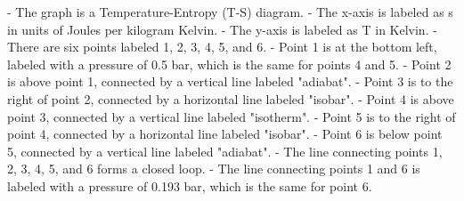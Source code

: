 - The graph is a Temperature-Entropy (T-S) diagram.
- The x-axis is labeled as s in units of Joules per kilogram Kelvin.
- The y-axis is labeled as T in Kelvin.
- There are six points labeled 1, 2, 3, 4, 5, and 6.
- Point 1 is at the bottom left, labeled with a pressure of 0.5 bar, which is the same for points 4 and 5.
- Point 2 is above point 1, connected by a vertical line labeled "adiabat".
- Point 3 is to the right of point 2, connected by a horizontal line labeled "isobar".
- Point 4 is above point 3, connected by a vertical line labeled "isotherm".
- Point 5 is to the right of point 4, connected by a horizontal line labeled "isobar".
- Point 6 is below point 5, connected by a vertical line labeled "adiabat".
- The line connecting points 1, 2, 3, 4, 5, and 6 forms a closed loop.
- The line connecting points 1 and 6 is labeled with a pressure of 0.193 bar, which is the same for point 6.